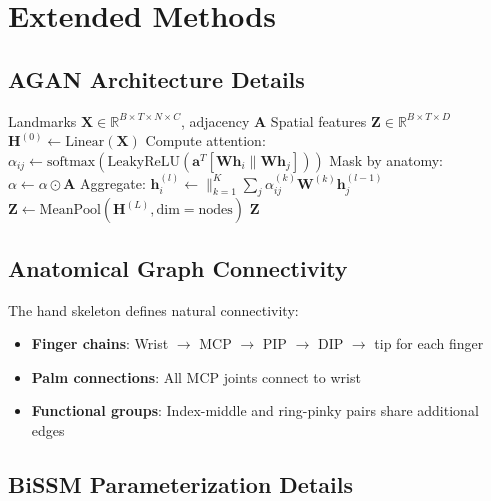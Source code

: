 \documentclass{article}
\theoremstyle{definition}
\theoremstyle{remark}
\begin{document}
\section{Extended Methods}

\subsection{AGAN Architecture Details}

\begin{algorithm}[ht]
\caption{Anatomical Graph Attention Forward Pass}
\label{alg:agan}
\begin{algorithmic}[1]
\REQUIRE Landmarks $\mathbf{X} \in \mathbb{R}^{B \times T \times N \times C}$, adjacency $\mathbf{A}$
\ENSURE Spatial features $\mathbf{Z} \in \mathbb{R}^{B \times T \times D}$
\STATE $\mathbf{H}^{(0)} \leftarrow \text{Linear}(\mathbf{X})$
\STATE Compute attention: $\alpha_{ij} \leftarrow \text{softmax}(\text{LeakyReLU}(\mathbf{a}^T[\mathbf{W}\mathbf{h}_i \| \mathbf{W}\mathbf{h}_j]))$
\STATE Mask by anatomy: $\alpha \leftarrow \alpha \odot \mathbf{A}$
\STATE Aggregate: $\mathbf{h}_i^{(l)} \leftarrow \|_{k=1}^{K} \sum_j \alpha_{ij}^{(k)} \mathbf{W}^{(k)} \mathbf{h}_j^{(l-1)}$
\ENDFOR
\STATE $\mathbf{Z} \leftarrow \text{MeanPool}(\mathbf{H}^{(L)}, \text{dim}=\text{nodes})$
\RETURN $\mathbf{Z}$
\end{algorithmic}
\end{algorithm}
\vspace{-2mm}

\subsection{Anatomical Graph Connectivity}

The hand skeleton defines natural connectivity:
\begin{itemize}[nosep,topsep=3pt,leftmargin=*]
\item \textbf{Finger chains}: Wrist $\rightarrow$ MCP $\rightarrow$ PIP $\rightarrow$ DIP $\rightarrow$ tip for each finger
\item \textbf{Palm connections}: All MCP joints connect to wrist
\item \textbf{Functional groups}: Index-middle and ring-pinky pairs share additional edges
\end{itemize}

\subsection{BiSSM Parameterization Details}
\label{app:bissm}
\end{document}
